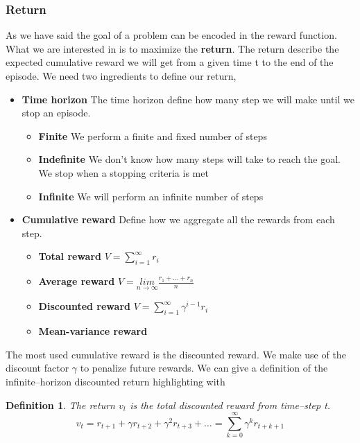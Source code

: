 \documentclass[main.tex]{subfiles}
\newtheorem{definition}{Definition}[section]
\begin{document}
\subsubsection{Return}
As we have said the goal of a problem can be encoded in the reward function. What we are interested in is to maximize the \textbf{return}. The return describe the expected cumulative reward we will get from a given time t to the end of the episode. We need two ingredients to define our return,
\begin{itemize}
    \item \textbf{Time horizon} The time horizon define how many step we will make until we stop an episode.
    \begin{itemize}
        \item \textbf{Finite} We perform a finite and fixed number of steps
        \item \textbf{Indefinite} We don't know how many steps will take to reach the goal. We stop when a stopping criteria is met
        \item \textbf{Infinite} We will perform an infinite number of steps
    \end{itemize}
    \item \textbf{Cumulative reward} Define how we aggregate all the rewards from each step.
    \begin{itemize}
        \item \textbf{Total reward} $V = \sum_{i=1}^{\infty} r_i$
        \item \textbf{Average reward} $V = \underset{n \rightarrow \infty}{lim} \frac{r_1 + \dots + r_n}{n}$
        \item \textbf{Discounted reward} $V = \sum_{i=1}^{\infty} \gamma^{i-1} r_i$
        \item \textbf{Mean-variance reward}
    \end{itemize}
\end{itemize}
The most used cumulative reward is the discounted reward. We make use of the discount factor $\gamma$ to penalize future rewards. We can give a definition of the infinite–horizon discounted return highlighting with
\begin{definition}
The return $v_t$ is the total discounted reward from time–step t.
\begin{equation}
    v_t = r_{t+1} + \gamma r_{t+2} + \gamma^2 r_{t+3} + \dots = \sum_{k=0}^{\infty} \gamma^k r_{t+k+1}
\end{equation}
\end{definition}
\end{document}
